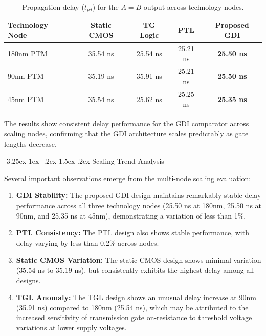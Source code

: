\documentclass[12pt,a4paper,oneside]{report}
\makeatletter
\renewcommand\subsection{\@startsection{subsection}{2}{\z@}%
                                     {-3.25ex\@plus -1ex \@minus -.2ex}%
                                     {1.5ex \@plus .2ex}%
                                     {\normalfont\normalsize\bfseries\itshape}}
\makeatother
\begin{document}
\begin{table}[H]
\centering
\caption{Propagation delay ($t_{pd}$) for the $A=B$ output across technology nodes.}
\label{tab:res_tech_nodes}
\vspace{0.2cm}
\begin{tabular}{|l|c|c|c|c|}
\hline
\textbf{Technology Node} & \textbf{Static CMOS} & \textbf{TG Logic} & \textbf{PTL} & \textbf{Proposed GDI} \\
\hline
180nm PTM & 35.54 ns & 25.54 ns & 25.21 ns & \textbf{25.50 ns} \\
\hline
90nm PTM & 35.19 ns & 35.91 ns & 25.21 ns & \textbf{25.50 ns} \\
\hline
45nm PTM & 35.54 ns & 25.62 ns & 25.25 ns & \textbf{25.35 ns} \\
\hline
\end{tabular}
\end{table}

The results show consistent delay performance for the GDI comparator across scaling nodes, confirming that the GDI architecture scales predictably as gate lengths decrease.

\subsection{Scaling Trend Analysis}

Several important observations emerge from the multi-node scaling evaluation:

\begin{enumerate}
\item \textbf{GDI Stability:} The proposed GDI design maintains remarkably stable delay performance across all three technology nodes (25.50 ns at 180nm, 25.50 ns at 90nm, and 25.35 ns at 45nm), demonstrating a variation of less than 1\%.
\item \textbf{PTL Consistency:} The PTL design also shows stable performance, with delay varying by less than 0.2\% across nodes.
\item \textbf{Static CMOS Variation:} The static CMOS design shows minimal variation (35.54 ns to 35.19 ns), but consistently exhibits the highest delay among all designs.
\item \textbf{TGL Anomaly:} The TGL design shows an unusual delay increase at 90nm (35.91 ns) compared to 180nm (25.54 ns), which may be attributed to the increased sensitivity of transmission gate on-resistance to threshold voltage variations at lower supply voltages.
\end{enumerate}
\end{document}
